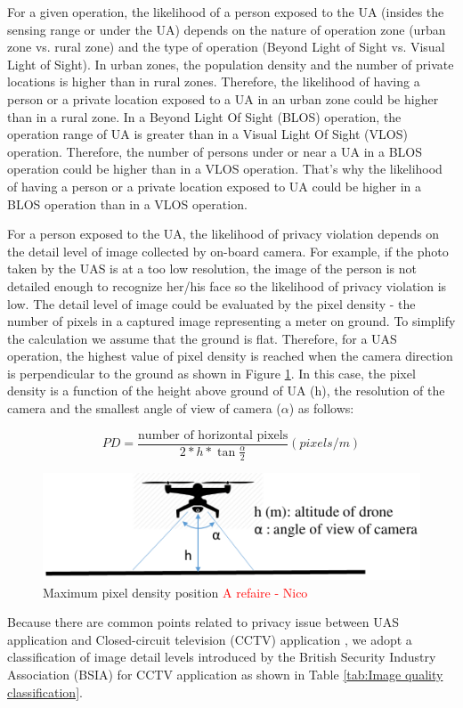 \documentclass[a4paper, 10, conference]{ieeeconf}  %
\begin{document}
For a given operation, the likelihood of a person exposed to the UA (insides the sensing range or under the UA) depends on the nature of operation zone (urban zone vs. rural zone) and the type of operation (Beyond Light of Sight vs. Visual Light of Sight). In urban zones, the population density and the number of private locations is higher than in rural zones. Therefore, the likelihood of having a person or a private location exposed to a UA in an urban zone could be higher than in a rural zone. In a Beyond Light Of Sight (BLOS) operation, the operation range of UA is greater than in a Visual Light Of Sight (VLOS) operation. Therefore, the number of persons under or near a UA in a BLOS operation could be higher than in a VLOS operation. That's why  the likelihood of having a person or a private location exposed to UA could be higher in a BLOS operation than in a VLOS operation. 


 For a person exposed to the UA, the likelihood of privacy violation depends on the detail level of image collected by on-board camera. For example, if the photo taken by the UAS is at a too low resolution, the image of the person is not detailed enough to recognize her/his face so the likelihood of privacy violation is low. The detail level of image could be evaluated by the pixel density - the number of pixels in a captured image representing a meter on ground. To simplify the calculation we assume that the ground is flat. Therefore, for a UAS operation, the highest value of pixel density is reached when the camera direction is perpendicular to the ground as shown in Figure \ref{flat ground}. In this case, the pixel density is a function of the height above ground of UA (h), the resolution of the camera and the smallest angle of view of camera ($\alpha$) as follows:
 
  \[PD=\frac{\text{number  of  horizontal  pixels}}{2*h*\tan \frac{\alpha}{2}}(pixels/m)\]

\begin{figure}[!ht]
	\centering
	\includegraphics[width=3.2 in]{image/Maximum_pixel_density.pdf}
	\caption{Maximum pixel density position \textcolor{red}{A refaire - Nico}}
	\label{flat ground}
\end{figure}
Because there are common points related to privacy issue between UAS application and Closed-circuit television (CCTV) application \cite{7383633, 7883702, 7285023}, we adopt a classification of image detail levels introduced by the British Security Industry Association (BSIA) for CCTV application as shown in Table \ref{tab:Image quality classification}.
\end{document}
